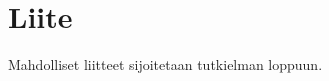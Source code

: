 \documentclass[a4paper,12pt,leqno,oneside]{report} %
\theoremstyle{plain}
\theoremstyle{definition}
\theoremstyle{remark}
\numberwithin{equation}{chapter}
\begin{document}
\chapter*{Liite}

Mahdolliset liitteet sijoitetaan tutkielman loppuun.

%


   
\end{document}
